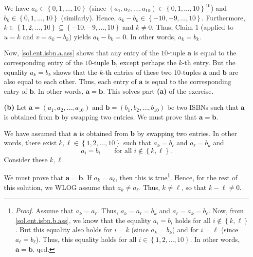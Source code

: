 \documentclass[paper=a4, fontsize=12pt]{scrartcl}%
\theoremstyle{plainsl}
\theoremstyle{definition}
\theoremstyle{remark}
\begin{document}
We have $a_{k}\in\left\{  0,1,\ldots,10\right\}  $ (since $\left(  a_{1}%
,a_{2},\ldots,a_{10}\right)  \in\left\{  0,1,\ldots,10\right\}  ^{10}$) and
$b_{k}\in\left\{  0,1,\ldots,10\right\}  $ (similarly). Hence, $a_{k}-b_{k}%
\in\left\{  -10,-9,\ldots,10\right\}  $. Furthermore, $k\in\left\{
1,2,\ldots,10\right\}  \subseteq\left\{  -10,-9,\ldots,10\right\}  $ and
$k\neq0$. Thus, Claim 1 (applied to $u=k$ and $v=a_{k}-b_{k}$) yields
$a_{k}-b_{k}=0$. In other words, $a_{k}=b_{k}$.

Now, \eqref{sol.ent.isbn.a.ass} shows that any entry of the $10$-tuple
$\mathbf{a}$ is equal to the corresponding entry of the $10$-tuple
$\mathbf{b}$, except perhaps the $k$-th entry. But the equality $a_{k}=b_{k}$
shows that the $k$-th entries of these two $10$-tuples $\mathbf{a}$ and
$\mathbf{b}$ are also equal to each other. Thus, each entry of $\mathbf{a}$ is
equal to the corresponding entry of $\mathbf{b}$. In other words,
$\mathbf{a}=\mathbf{b}$. This solves part \textbf{(a)} of the exercise.

\bigskip

\textbf{(b)} Let $\mathbf{a}=\left(  a_{1},a_{2},\ldots,a_{10}\right)  $ and
$\mathbf{b}=\left(  b_{1},b_{2},\ldots,b_{10}\right)  $ be two ISBNs such that
$\mathbf{a}$ is obtained from $\mathbf{b}$ by swapping two entries. We must
prove that $\mathbf{a}=\mathbf{b}$.

We have assumed that $\mathbf{a}$ is obtained from $\mathbf{b}$ by swapping
two entries. In other words, there exist $k,\ell\in\left\{  1,2,\ldots
,10\right\}  $ such that $a_{k}=b_{\ell}$ and $a_{\ell}=b_{k}$ and
\begin{equation}
a_{i}=b_{i}\qquad\text{for all }i\notin\left\{  k,\ell\right\}  .
\label{sol.ent.isbn.b.ass}%
\end{equation}
Consider these $k,\ell$.

We must prove that $\mathbf{a}=\mathbf{b}$. If $a_{k}=a_{\ell}$, then this is
true\footnote{\textit{Proof.} Assume that $a_{k}=a_{\ell}$. Thus,
$a_{k}=a_{\ell}=b_{k}$ and $a_{\ell}=a_{k}=b_{\ell}$. Now, from
\eqref{sol.ent.isbn.b.ass}, we know that the equality $a_{i}=b_{i}$ holds for
all $i\notin\left\{  k,\ell\right\}  $. But this equality also holds for $i=k$
(since $a_{k}=b_{k}$) and for $i=\ell$ (since $a_{\ell}=b_{\ell}$). Thus, this
equality holds for all $i\in\left\{  1,2,\ldots,10\right\}  $. In other words,
$\mathbf{a}=\mathbf{b}$, qed.}. Hence, for the rest of this solution, we WLOG
assume that $a_{k}\neq a_{\ell}$. Thus, $k\neq\ell$, so that $k-\ell\neq0$.
\end{document}
